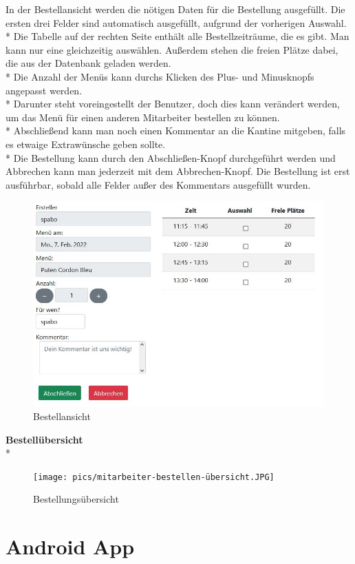 In der Bestellansicht werden die nötigen Daten für die Bestellung ausgefüllt. Die ersten drei Felder sind automatisch ausgefüllt, aufgrund der vorherigen Auswahl. \\*
Die Tabelle auf der rechten Seite enthält alle Bestellzeiträume, die es gibt. Man kann nur eine gleichzeitig auswählen. Außerdem stehen die freien Plätze dabei, die aus der Datenbank geladen werden.\\*
Die Anzahl der Menüs kann durchs Klicken des Plus- und Minusknopfs angepasst werden.  \\*
Darunter steht voreingestellt der Benutzer, doch dies kann verändert werden, um das Menü für einen anderen Mitarbeiter bestellen zu können. \\*
Abschließend kann man noch einen Kommentar an die Kantine mitgeben, falls es etwaige Extrawünsche geben sollte. \\*
Die Bestellung kann durch den Abschließen-Knopf durchgeführt werden und Abbrechen kann man jederzeit mit dem Abbrechen-Knopf.
Die Bestellung ist erst ausführbar, sobald alle Felder außer des Kommentars ausgefüllt wurden.
\begin{figure}[htp]
    \centering
    \includegraphics[scale=0.6]{pics/mitarbeiter-bestellen.JPG}
    \caption{Bestellansicht}
    \label{fig:impl:BestellenMitarbeiter}
\end{figure}
\pagebreak

\textbf{Bestellübersicht} \\*

\begin{figure}[htp]
    \centering
    \texttt{[image: pics/mitarbeiter-bestellen-übersicht.JPG]}
    \caption{Bestellungsübersicht}
    \label{fig:impl:BestellenMitarbeiterUebersicht}
\end{figure}

\section{Android App}